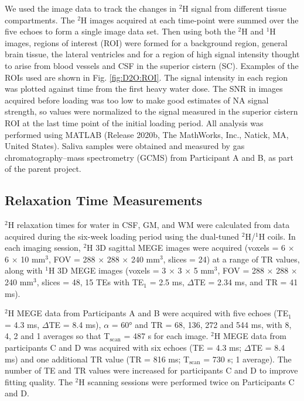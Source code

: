 We used the image data to track the changes in $^2$H signal from different tissue compartments. The $^2$H images acquired at each time-point were summed over the five echoes to form a single image data set. Then using both the $^2$H and $^1$H images, regions of interest (ROI) were formed for a background region, general brain tissue, the lateral ventricles and for a region of high signal intensity thought to arise from blood vessels and \ac{CSF} in the superior cistern (SC). Examples of the \ac{ROI}s used are shown in Fig. \ref{fig:D2O:ROI}. The signal intensity in each region was plotted against time from the first heavy water dose. The \ac{SNR} in images acquired before loading was too low to make good estimates of \ac{NA} signal strength, so values were normalized to the signal measured in the superior cistern \ac{ROI} at the last time point of the initial loading period. All analysis was performed using MATLAB (Release 2020b, The MathWorks, Inc., Natick, MA, United States). Saliva samples were obtained and measured by gas chromatography–mass spectrometry (GCMS) from Participant A and B, as part of the parent project.

\subsection{Relaxation Time Measurements}
\label{Chap:D2O:Relaxation}

$^2$H relaxation times for water in \ac{CSF}, \ac{GM}, and \ac{WM} were calculated from data acquired during the six-week loading period using the dual-tuned $^2$H/$^1$H coils. In each imaging session, $^2$H 3D sagittal \ac{MEGE} images were acquired (voxels = 6 $\times$ 6 $\times$ 10 mm$^3$, \ac{FOV} = 288 $\times$ 288 $\times$ 240 mm$^3$, slices = 24) at a range of \ac{TR} values, along with $^1$H 3D \ac{MEGE} images (voxels = 3 $\times$ 3 $\times$ 5 mm$^3$, \ac{FOV} = 288 $\times$ 288 $\times$ 240 mm$^3$, slices = 48, 15 \ac{TE}s with TE$_1$ = 2.5 ms, $\Delta$TE = 2.34 ms, and TR = 41 ms). 

$^2$H \ac{MEGE} data from Participants A and B were acquired with five echoes (\ac{TE}$_1$ = 4.3 ms, $\Delta$\ac{TE} = 8.4 ms), $\alpha$ = 60° and \ac{TR} = 68, 136, 272 and 544 ms, with 8, 4, 2 and 1 averages so that T$_\text{scan}$ = 487 s for each image. $^2$H \ac{MEGE} data from participants C and D was acquired with six echoes (\ac{TE} = 4.3 ms; $\Delta$TE = 8.4 ms) and one additional \ac{TR} value (TR = 816 ms; T$_\text{scan}$ = 730 s; 1 average). 
The number of \ac{TE} and \ac{TR} values were increased for participants C and D to improve fitting quality. The $^2$H scanning sessions were performed twice on Participants C and D.

